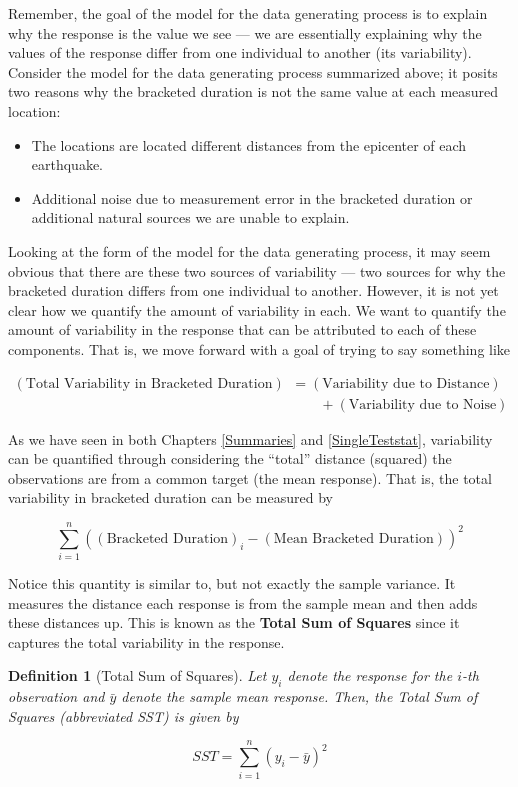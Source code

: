 \documentclass[
]{book}
\providecommand{\tightlist}{%
  \setlength{\itemsep}{0pt}\setlength{\parskip}{0pt}}
\theoremstyle{plain}
\theoremstyle{mydefn}
\newtheorem{definition}{Definition}[chapter]
\theoremstyle{myexmpl}
\theoremstyle{remark}
\begin{document}
Remember, the goal of the model for the data generating process is to explain why the response is the value we see --- we are essentially explaining why the values of the response differ from one individual to another (its variability). Consider the model for the data generating process summarized above; it posits two reasons why the bracketed duration is not the same value at each measured location:

\begin{itemize}
\tightlist
\item
  The locations are located different distances from the epicenter of each earthquake.
\item
  Additional noise due to measurement error in the bracketed duration or additional natural sources we are unable to explain.
\end{itemize}

Looking at the form of the model for the data generating process, it may seem obvious that there are these two sources of variability --- two sources for why the bracketed duration differs from one individual to another. However, it is not yet clear how we quantify the amount of variability in each. We want to quantify the amount of variability in the response that can be attributed to each of these components. That is, we move forward with a goal of trying to say something like

\[
\begin{aligned}
(\text{Total Variability in Bracketed Duration}) &= (\text{Variability due to Distance}) \\
  &\qquad + (\text{Variability due to Noise})
\end{aligned}
\]

As we have seen in both Chapters \ref{Summaries} and \ref{SingleTeststat}, variability can be quantified through considering the ``total'' distance (squared) the observations are from a common target (the mean response). That is, the total variability in bracketed duration can be measured by

\[\sum_{i=1}^{n} \left((\text{Bracketed Duration})_i - (\text{Mean Bracketed Duration})\right)^2\]

Notice this quantity is similar to, but not exactly the sample variance. It measures the distance each response is from the sample mean and then adds these distances up. This is known as the \textbf{Total Sum of Squares} since it captures the total variability in the response.

\begin{definition}[Total Sum of Squares]
\protect\hypertarget{def:defn-sst}{}{\label{def:defn-sst} {} }Let \(y_i\) denote the response for the \(i\)-th observation and \(\bar{y}\) denote the sample mean response. Then, the Total Sum of Squares (abbreviated SST) is given by

\[SST = \sum_{i=1}^{n} \left(y_i - \bar{y}\right)^2\]
\end{definition}
\end{document}

